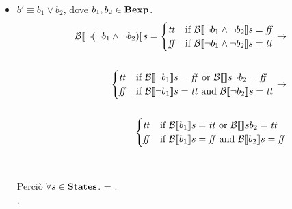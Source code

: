 {\begin{enumerate}[label=(\alph*)]
\begin{itemize}
    \item $ b' \equiv b_1 \lor b_2$, dove $b_1, b_2 \in \mbox{\textbf{Bexp}}$. \\
      \begin{align*}
        \B{\lnot (\lnot b_1 \land \lnot b_2)} =
        \begin{cases}
        \semtrue &
        \mbox{if} \ \B{\lnot b_1 \land \lnot b_2} = \semfalse \\
        \semfalse &
        \mbox{if} \ \B{\lnot b_1 \land \lnot b_2} = \semtrue \\
        \end{cases}
        \rightarrow \\ \\
        \begin{cases}
        \semtrue &
        \mbox{if} \ \B {\lnot b_1} = \semfalse
                    \mbox{ or }
                    \B {\lnot b_2} = \semfalse \\
        \semfalse &
        \mbox{if} \ \B{\lnot b_1} = \semtrue
                    \mbox{ and }
                    \B{\lnot b_2} = \semtrue \\
        \end{cases}
        \rightarrow \\ \\
        \begin{cases}
        \semtrue &
        \mbox{if} \ \B {b_1} = \semtrue
                    \mbox{ or }
                    \B {b_2} = \semtrue \\
        \semfalse &
        \mbox{if} \ \B{b_1} = \semfalse
                    \mbox{ and }
                    \B{b_2} = \semfalse \\
        \end{cases}
      \end{align*} \\ \\
      Perciò $\forall s \in \mbox{\textbf{States}}$. =
      . \\.


\end{itemize}
\end{enumerate}}
